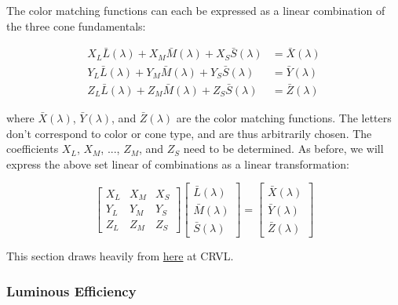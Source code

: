 \documentclass{article}
\begin{document}
\begin{multicols}{2}
The color matching functions can each be expressed as a linear combination of the three cone fundamentals:

\begin{equation} %
    \begin{aligned}
        X_L\bar{L}(\lambda)+X_M\bar{M}(\lambda)+X_S\bar{S}(\lambda)&=\bar{X}(\lambda)\\
        Y_L\bar{L}(\lambda)+Y_M\bar{M}(\lambda)+Y_S\bar{S}(\lambda)&=\bar{Y}(\lambda)\\
        Z_L\bar{L}(\lambda)+Z_M\bar{M}(\lambda)+Z_S\bar{S}(\lambda)&=\bar{Z}(\lambda)
    \end{aligned}
\end{equation}

where $\bar{X}(\lambda)$, $\bar{Y}(\lambda)$, and $\bar{Z}(\lambda)$ are the color matching functions.  The letters don't correspond to color or cone type, and are thus arbitrarily chosen.  The coefficients $X_L$, $X_M$, ..., $Z_M$, and $Z_S$ need to be determined.  As before, we will express the above set linear of combinations as a linear transformation:

\begin{equation} %
    \begin{bmatrix}
        X_L&X_M&X_S\\
        Y_L&Y_M&Y_S\\
        Z_L&Z_M&Z_S
    \end{bmatrix}\begin{bmatrix}
        \bar{L}(\lambda)\\
        \bar{M}(\lambda)\\
        \bar{S}(\lambda)
    \end{bmatrix}=\begin{bmatrix}
        \bar{X}(\lambda)\\
        \bar{Y}(\lambda)\\
        \bar{Z}(\lambda)
    \end{bmatrix}
\end{equation}

This section draws heavily from \href{http://www.cvrl.org/database/text/cienewxyz/cie2012xyz10.htm}{here} at CRVL.

\subsubsection{Luminous Efficiency} %


\end{multicols}
\end{document}
